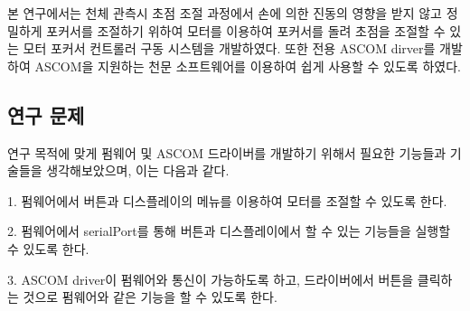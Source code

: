 본 연구에서는 천체 관측시 초점 조절 과정에서 손에 의한 진동의 영향을 받지 않고 정밀하게 포커서를 조절하기 위하여 모터를 이용하여 포커서를 돌려 초점을 조절할 수 있는 모터 포커서 컨트롤러 구동 시스템을 개발하였다. 또한 전용 ASCOM dirver를 개발하여 ASCOM을 지원하는 천문 소프트웨어를 이용하여 쉽게 사용할 수 있도록 하였다. 


\subsection{연구 문제}

연구 목적에 맞게 펌웨어 및 ASCOM 드라이버를 개발하기 위해서 필요한 기능들과 기술들을 생각해보았으며, 이는 다음과 같다.

1. 펌웨어에서 버튼과 디스플레이의 메뉴를 이용하여 모터를 조절할 수 있도록 한다.

2. 펌웨어에서 serialPort를 통해 버튼과 디스플레이에서 할 수 있는 기능들을 실행할 수 있도록 한다.

3. ASCOM driver이 펌웨어와 통신이 가능하도록 하고, 드라이버에서 버튼을 클릭하는 것으로 펌웨어와 같은 기능을 할 수 있도록 한다.